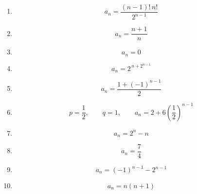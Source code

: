 \begin{enumerate}[label=\textbf{問\arabic*.},leftmargin=3.8em,format=\bookitemlink{practice-basic}{answer}{solution}]
{\[\begin{aligned}
          a_n&=\frac{2^n+(-1)^{n-1}}3,\\
          b_n&=\frac{2^{n-1}-(-1)^{n-1}}3
        \end{aligned}
      \]
    }
  \item \[
      a_n=\frac{(n-1)!\,n!}{2^{n-1}}
    \]
  \item \[
      a_n=\frac{n+1}{n}
    \]
  \item \[
      a_n=0
    \]
  \item \[
      a_n=2^{\,n+2^{n-1}}
    \]
  \item \[
      a_n=\frac{1+(-1)^{n-1}}2
    \]
  \item \[
      p=\frac12,\qquad q=1,\qquad
      a_n=2+6\left(\frac12\right)^{n-1}
    \]
  \item \[
      a_n=2^n-n
    \]
  \item \[
      a_n=\frac74
    \]
  \item \[
      a_n=(-1)^{n-1}-2^{n-1}
    \]
  \item \[
      a_n=n(n+1)
    \]
\end{enumerate}

